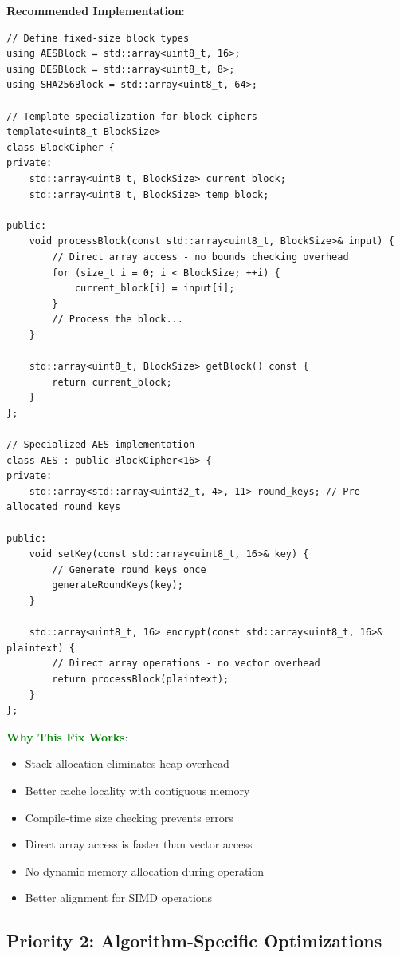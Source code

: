 \documentclass[11pt,a4paper]{article}
\begin{document}
\textbf{Recommended Implementation}:
\begin{lstlisting}
// Define fixed-size block types
using AESBlock = std::array<uint8_t, 16>;
using DESBlock = std::array<uint8_t, 8>;
using SHA256Block = std::array<uint8_t, 64>;

// Template specialization for block ciphers
template<uint8_t BlockSize>
class BlockCipher {
private:
    std::array<uint8_t, BlockSize> current_block;
    std::array<uint8_t, BlockSize> temp_block;
    
public:
    void processBlock(const std::array<uint8_t, BlockSize>& input) {
        // Direct array access - no bounds checking overhead
        for (size_t i = 0; i < BlockSize; ++i) {
            current_block[i] = input[i];
        }
        // Process the block...
    }
    
    std::array<uint8_t, BlockSize> getBlock() const {
        return current_block;
    }
};

// Specialized AES implementation
class AES : public BlockCipher<16> {
private:
    std::array<std::array<uint32_t, 4>, 11> round_keys; // Pre-allocated round keys
    
public:
    void setKey(const std::array<uint8_t, 16>& key) {
        // Generate round keys once
        generateRoundKeys(key);
    }
    
    std::array<uint8_t, 16> encrypt(const std::array<uint8_t, 16>& plaintext) {
        // Direct array operations - no vector overhead
        return processBlock(plaintext);
    }
};
\end{lstlisting}

\textcolor{green}{\textbf{Why This Fix Works}}:
\begin{itemize}
    \item Stack allocation eliminates heap overhead
    \item Better cache locality with contiguous memory
    \item Compile-time size checking prevents errors
    \item Direct array access is faster than vector access
    \item No dynamic memory allocation during operation
    \item Better alignment for SIMD operations
\end{itemize}

\subsection{Priority 2: Algorithm-Specific Optimizations}
\end{document}
